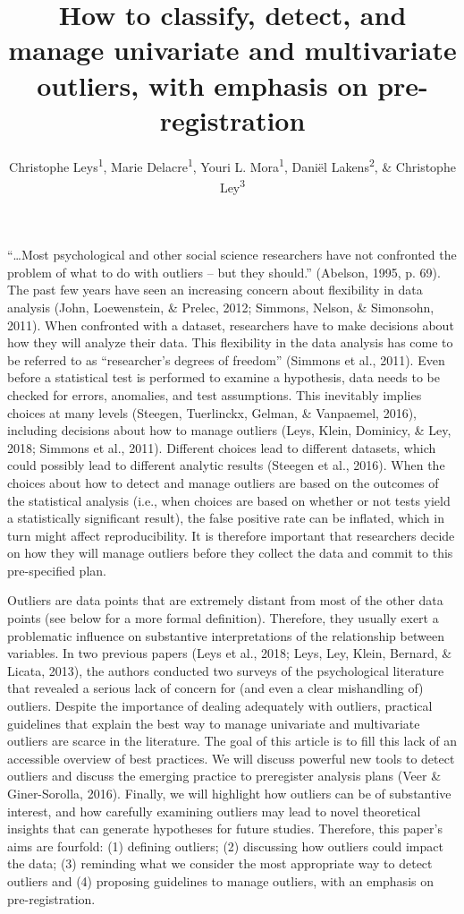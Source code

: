 \documentclass[man,floatsintext]{apa6}
\title{How to classify, detect, and manage univariate and multivariate
outliers, with emphasis on pre-registration}
\author{Christophe Leys\textsuperscript{1}, Marie Delacre\textsuperscript{1},
Youri L. Mora\textsuperscript{1}, Daniël Lakens\textsuperscript{2}, \&
Christophe Ley\textsuperscript{3}}
\date{}
\affiliation{
\vspace{0.5cm}
\textsuperscript{1} Université Libre de Bruxelles, Service of Analysis of the Data (SAD), Bruxelles, Belgium\\\textsuperscript{2} Eindhoven University of Technology, Human Technology Interaction Group, Eindhoven, the Netherlands\\\textsuperscript{3} Universiteit Gent, Department of Applied Mathematics, Computer Science and Statistics, Gent, Belgium}
\begin{document}
\maketitle

\enquote{\ldots{}Most psychological and other social science researchers
have not confronted the problem of what to do with outliers -- but they
should.} (Abelson, 1995, p. 69). The past few years have seen an
increasing concern about flexibility in data analysis (John,
Loewenstein, \& Prelec, 2012; Simmons, Nelson, \& Simonsohn, 2011). When
confronted with a dataset, researchers have to make decisions about how
they will analyze their data. This flexibility in the data analysis has
come to be referred to as \enquote{researcher's degrees of freedom}
(Simmons et al., 2011). Even before a statistical test is performed to
examine a hypothesis, data needs to be checked for errors, anomalies,
and test assumptions. This inevitably implies choices at many levels
(Steegen, Tuerlinckx, Gelman, \& Vanpaemel, 2016), including decisions
about how to manage outliers (Leys, Klein, Dominicy, \& Ley, 2018;
Simmons et al., 2011). Different choices lead to different datasets,
which could possibly lead to different analytic results (Steegen et al.,
2016). When the choices about how to detect and manage outliers are
based on the outcomes of the statistical analysis (i.e., when choices
are based on whether or not tests yield a statistically significant
result), the false positive rate can be inflated, which in turn might
affect reproducibility. It is therefore important that researchers
decide on how they will manage outliers before they collect the data and
commit to this pre-specified plan.

Outliers are data points that are extremely distant from most of the
other data points (see below for a more formal definition). Therefore,
they usually exert a problematic influence on substantive
interpretations of the relationship between variables. In two previous
papers (Leys et al., 2018; Leys, Ley, Klein, Bernard, \& Licata, 2013),
the authors conducted two surveys of the psychological literature that
revealed a serious lack of concern for (and even a clear mishandling of)
outliers. Despite the importance of dealing adequately with outliers,
practical guidelines that explain the best way to manage univariate and
multivariate outliers are scarce in the literature. The goal of this
article is to fill this lack of an accessible overview of best
practices. We will discuss powerful new tools to detect outliers and
discuss the emerging practice to preregister analysis plans (Veer \&
Giner-Sorolla, 2016). Finally, we will highlight how outliers can be of
substantive interest, and how carefully examining outliers may lead to
novel theoretical insights that can generate hypotheses for future
studies. Therefore, this paper's aims are fourfold: (1) defining
outliers; (2) discussing how outliers could impact the data; (3)
reminding what we consider the most appropriate way to detect outliers
and (4) proposing guidelines to manage outliers, with an emphasis on
pre-registration.
\end{document}
